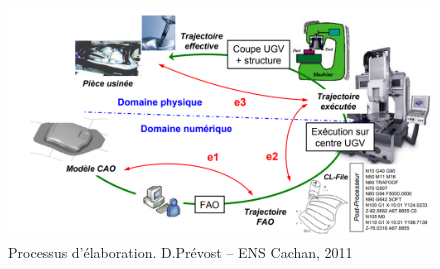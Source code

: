 \documentclass[12pt]{article}
\begin{document}
\begin{figure}
\centering
\includegraphics[width=1\linewidth]{mod1.PNG}
\caption{Processus d'élaboration. D.Prévost -- ENS Cachan, 2011}
\label{mod1}
\end{figure}










\end{document}
